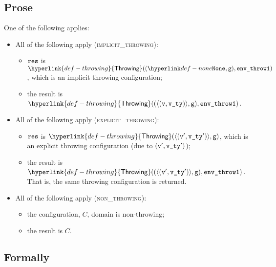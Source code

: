 \documentclass{book}
\newcommand\rethrowimplicit[0]{\hyperlink{def-rethrowimplicit}{\texttt{rethrow\_implicit}}}
\newcommand\valuereadfrom[0]{\hyperlink{def-valuereadfrom}{\textsf{value\_read\_from}}}
\newcommand\Throwing[0]{\hyperlink{def-throwing}{\textsf{Throwing}}}
\newcommand\vg[0]{\texttt{g}}
\newcommand\envthrowone[0]{\texttt{env\_throw1}}
\newcommand\vvty[0]{\texttt{v\_ty}}
\newcommand\eid[0]{\texttt{e\_id}}
\begin{document}
\subsection{Prose}
One of the following applies:
\begin{itemize}
  \item All of the following apply (\textsc{implicit\_throwing}):
  \begin{itemize}
    \item $\texttt{res}$ is $\Throwing((\None, \vg), \envthrowone)$, which is an implicit throwing configuration;
    \item the result is $\Throwing((\langle(\vv, \vvty)\rangle, \vg), \envthrowone)$.
  \end{itemize}

  \item All of the following apply (\textsc{explicit\_throwing}):
  \begin{itemize}
    \item $\texttt{res}$ is $\Throwing(\langle(\vv', \vvty')\rangle, \vg)$, which is an explicit throwing configuration
    (due to $(\vv', \vvty')$);
    \item the result is $\Throwing((\langle(\vv', \vvty')\rangle, \vg), \envthrowone)$. \\
    That is, the same throwing configuration is returned.
  \end{itemize}

  \item All of the following apply (\textsc{non\_throwing}):
  \begin{itemize}
    \item the configuration, $C$, domain is non-throwing;
    \item the result is $C$.
  \end{itemize}
\end{itemize}


\subsection{Formally}
\end{document}
